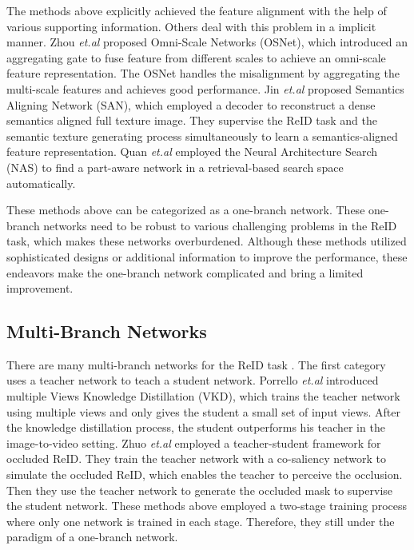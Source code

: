 \documentclass[a4paper]{cas-dc}
\begin{document}
The methods above explicitly achieved the feature alignment with the help of various supporting information. Others deal with this problem in a implicit manner. Zhou \textit{et.al} \cite{RN479} proposed Omni-Scale Networks (OSNet), which introduced an aggregating gate to fuse feature from different scales to achieve an omni-scale feature representation. The OSNet handles the misalignment by aggregating the multi-scale features and achieves good performance. Jin \textit{et.al} \cite{RN345} proposed Semantics Aligning Network (SAN), which employed a decoder to reconstruct a dense semantics aligned full texture image. They supervise the ReID task and the semantic texture generating process simultaneously to learn a semantics-aligned feature representation. Quan \textit{et.al} \cite{RN448} employed the Neural Architecture Search (NAS) to find a part-aware network in a retrieval-based search space automatically. 

These methods above can be categorized as a one-branch network. These one-branch networks need to be robust to various challenging problems in the ReID task, which makes these networks overburdened. Although these methods utilized sophisticated designs or additional information to improve the performance, these endeavors make the one-branch network complicated and bring a limited improvement.

\subsection{Multi-Branch Networks}
There are many multi-branch networks for the ReID task \cite{RN427} \cite{RN426} \cite{RN428} \cite{RN335} \cite{RN339} \cite{RN430}. The first category uses a teacher network to teach a student network. Porrello \textit{et.al} \cite{RN415} introduced multiple Views Knowledge Distillation (VKD), which trains the teacher network using multiple views and only gives the student a small set of input views. After the knowledge distillation process, the student outperforms his teacher in the image-to-video setting. Zhuo \textit{et.al} \cite{RN427} employed a teacher-student framework for occluded ReID. They train the teacher network with a co-saliency network to simulate the occluded ReID, which enables the teacher to perceive the occlusion. Then they use the teacher network to generate the occluded mask to supervise the student network. These methods above employed a two-stage training process where only one network is trained in each stage. Therefore, they still under the paradigm of a one-branch network.
\end{document}
